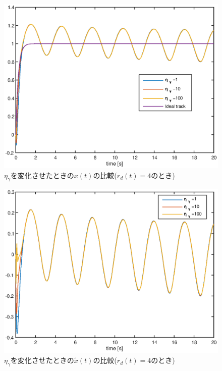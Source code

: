 \documentclass[a4paper,12pt]{jarticle}
\begin{document}
%
%
\begin{figure}[htb]
    \begin{center}
       \includegraphics[width=140mm]{fig/x_rd4_Etag.eps}
	 \caption{$\eta_\gamma$を変化させたときの$x(t)$の比較($r_d(t)=4$のとき)
	 }
        \label{fig:x_rd4etag}
    \end{center}
\end{figure}
%
%
\begin{figure}[htb]
    \begin{center}
       \includegraphics[width=140mm]{fig/x_tilde_etag.eps}
	 \caption{$\eta_\gamma$を変化させたときの$\tilde{x}(t)$の比較($r_d(t)=4$のとき)
	 }
        \label{fig:x_tilde_etag}
    \end{center}
\end{figure}
\end{document}
